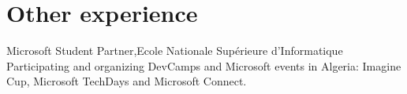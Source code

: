 \section{Other experience}
  \resumeSubHeadingListStart
    \resumeSubheading
    {Microsoft Student Partner,}{Ecole Nationale Supérieure d’Informatique}{}
    {}
      \resumeItemListStart
        \vspace{+10pt}
        \renewcommand{\labelitemii}{\raisebox{.25cm}{$\bullet$}}
        {Participating and organizing DevCamps and Microsoft events in Algeria: Imagine Cup, Microsoft TechDays and Microsoft Connect.}
      \resumeItemListEnd
  \resumeSubHeadingListEnd